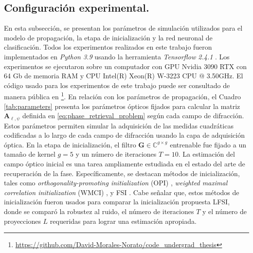 
\subsection{Configuración experimental.}

En esta subsección, se presentan los parámetros de simulación utilizados para el modelo de propagación, la etapa de inicialización y la red neuronal de clasificación. Todos los experimentos realizados en este trabajo fueron implementados en \textit{Python 3.9} usando la herramienta \textit{Tensorflow 2.4.1}  . Los experimentos se ejecutaron sobre un computador con GPU Nvidia 3090 RTX con 64 Gb de memoria RAM y CPU Intel(R) Xeon(R) W-3223 CPU @ 3.50GHz. El código usado para los experimentos de este trabajo puede ser consultado de manera pública en \footnote{\href{https://github.com/David-Morales-Norato/code_undergrad_thesis}{https://github.com/David-Morales-Norato/code\_undergrad\_thesis}}. En relación con los parámetros de propagación, el Cuadro \ref{tab:parameters} presenta los parámetros ópticos fijados para calcular la matriz $\mathbf{A}_{\ell,\psi}$ definida en \eqref{eq:phase_retrieval_problem} según cada campo de difracción. Estos parámetros permiten simular la adquisición de las medidas cuadráticas codificadas a lo largo de cada campo de difracción usando la capa de adquisición óptica. En la etapa de inicialización, el filtro $\mathbf{G} \in \mathbb{C}^{g\times g}$ entrenable fue fijado a un tamaño de kernel $g=5$ y un número de iteraciones $T=10$. La estimación del campo óptico inicial es una tarea ampliamente estudiada en el estado del arte de recuperación de la fase. Específicamente, se destacan métodos de inicialización, tales como \textit{orthogonality-promoting initialization} (OPI) , \textit{weighted maximal correlation initialization} (WMCI) , y FSI . Cabe señalar que, estos métodos de inicialización fueron usados para comparar la inicialización propuesta LFSI, donde se comparó la robustez al ruido, el número de iteraciones ${T}$ y el número de proyecciones ${L}$ requeridas para lograr una estimación apropiada. 

